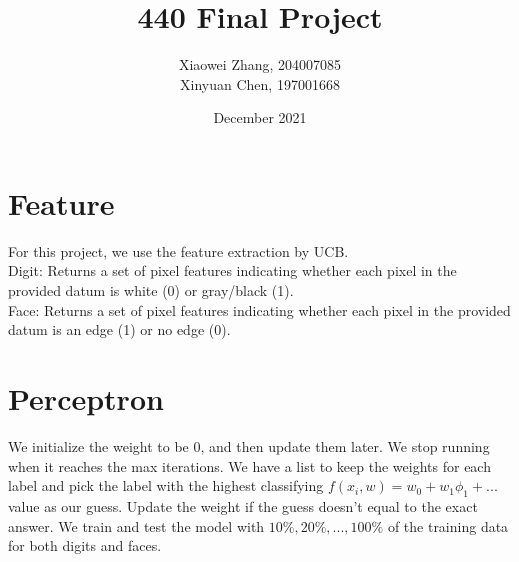 \documentclass{article}
\title{440 Final Project}
\author{Xiaowei Zhang, 204007085 \\ Xinyuan Chen, 197001668}
\date{December 2021}
\begin{document}
\maketitle

\section*{Feature}
For this project, we use the feature extraction by UCB.\\
Digit: Returns a set of pixel features indicating whether each pixel in the provided datum is white (0) or gray/black (1).\\
Face: Returns a set of pixel features indicating whether each pixel in the provided datum is an edge (1) or no edge (0).

\section*{Perceptron}
We initialize the weight to be 0, and then update them later. We stop running when it reaches the max iterations. We have a list to keep the weights for each label and pick the label with the highest classifying $f(x_i, w) = w_0 + w_1\phi_1+...$ value as our guess. Update the weight if the guess doesn't equal to the exact answer. We train and test the model with $10\%, 20\%, ..., 100\%$ of the training data for both digits and faces.
\end{document}
